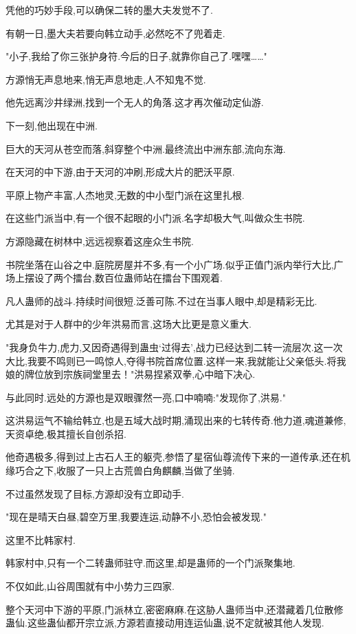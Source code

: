 \begin{this_body}
凭他的巧妙手段,可以确保二转的墨大夫发觉不了.

有朝一日,墨大夫若要向韩立动手,必然吃不了兜着走.

"小子,我给了你三张护身符.今后的日子,就靠你自己了.嘿嘿……"

方源悄无声息地来,悄无声息地走,人不知鬼不觉.

他先远离沙井绿洲,找到一个无人的角落.这才再次催动定仙游.

下一刻,他出现在中洲.

巨大的天河从苍空而落,斜穿整个中洲.最终流出中洲东部,流向东海.

在天河的中下游,由于天河的冲刷,形成大片的肥沃平原.

平原上物产丰富,人杰地灵,无数的中小型门派在这里扎根.

在这些门派当中,有一个很不起眼的小门派.名字却极大气,叫做众生书院.

方源隐藏在树林中,远远视察着这座众生书院.

书院坐落在山谷之中.庭院房屋并不多,有一个小广场.似乎正值门派内举行大比,广场上摆设了两个擂台,数百位蛊师站在擂台下围观着.

凡人蛊师的战斗.持续时间很短.泛善可陈.不过在当事人眼中,却是精彩无比.

尤其是对于人群中的少年洪易而言,这场大比更是意义重大.

"我身负牛力,虎力,又因奇遇得到蛊虫‘过得去’,战力已经达到二转一流层次.这一次大比,我要不鸣则已一鸣惊人,夺得书院首席位置.这样一来,我就能让父亲低头.将我娘的牌位放到宗族祠堂里去！"洪易捏紧双拳,心中暗下决心.

与此同时.远处的方源也是双眼骤然一亮,口中喃喃:"发现你了,洪易."

这洪易运气不输给韩立,也是五域大战时期,涌现出来的七转传奇.他力道,魂道兼修,天资卓绝,极其擅长自创杀招.

他奇遇极多,得到过上古石人王的躯壳,参悟了星宿仙尊流传下来的一道传承,还在机缘巧合之下,收服了一只上古荒兽白角麒麟,当做了坐骑.

不过虽然发现了目标,方源却没有立即动手.

"现在是晴天白昼,碧空万里,我要连运,动静不小,恐怕会被发现."

这里不比韩家村.

韩家村中,只有一个二转蛊师驻守.而这里,却是蛊师的一个门派聚集地.

不仅如此,山谷周围就有中小势力三四家.

整个天河中下游的平原,门派林立,密密麻麻.在这胁人蛊师当中,还潜藏着几位散修蛊仙.这些蛊仙都开宗立派,方源若直接动用连运仙蛊,说不定就被其他人发现.


\end{this_body}
